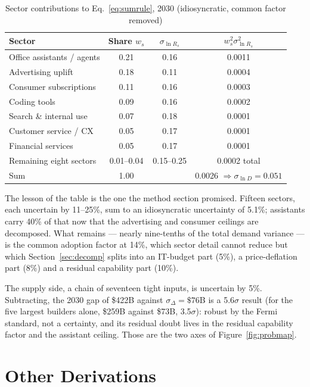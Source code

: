 \documentclass[11pt,letterpaper]{article}
\begin{document}
\begin{table}[htbp]
\centering\small
\caption{Sector contributions to Eq.~\ref{eq:sumrule}, 2030 (idiosyncratic, common factor removed)}
\label{tab:sectorvar}
\begin{tabular}{lccc}
\toprule
\textbf{Sector} & \textbf{Share $w_s$} & $\sigma_{\ln R_s}$ & $w_s^{2}\sigma^{2}_{\ln R_s}$ \\
\midrule
Office assistants / agents & 0.21 & 0.16 & 0.0011 \\
Advertising uplift & 0.18 & 0.11 & 0.0004 \\
Consumer subscriptions & 0.11 & 0.16 & 0.0003 \\
Coding tools & 0.09 & 0.16 & 0.0002 \\
Search \& internal use & 0.07 & 0.18 & 0.0001 \\
Customer service / CX & 0.05 & 0.17 & 0.0001 \\
Financial services & 0.05 & 0.17 & 0.0001 \\
Remaining eight sectors & 0.01--0.04 & 0.15--0.25 & 0.0002 total \\
\midrule
Sum & 1.00 & & 0.0026 $\Rightarrow\sigma_{\ln D}=0.051$ \\
\bottomrule
\end{tabular}
\end{table}

The lesson of the table is the one the method section promised. Fifteen sectors, each uncertain by 11--25\%, sum to an idiosyncratic uncertainty of 5.1\%; assistants carry 40\% of that now that the advertising and consumer ceilings are decomposed. What remains --- nearly nine-tenths of the total demand variance --- is the common adoption factor at 14\%, which sector detail cannot reduce but which Section~\ref{sec:decomp} splits into an IT-budget part (5\%), a price-deflation part (8\%) and a residual capability part (10\%).

The supply side, a chain of seventeen tight inputs, is uncertain by 5\%. Subtracting, the 2030 gap of \$422B against $\sigma_{\Delta}=\$76$B is a 5.6$\sigma$ result (for the five largest builders alone, \$259B against \$73B, 3.5$\sigma$): robust by the Fermi standard, not a certainty, and its residual doubt lives in the residual capability factor and the assistant ceiling. Those are the two axes of Figure~\ref{fig:probmap}.

\section{Other Derivations}
\end{document}
